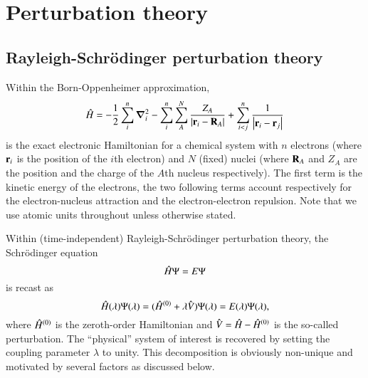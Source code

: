\documentclass[aps,prb,reprint,noshowkeys,superscriptaddress]{revtex4-1}
\newcommand{\hH}{\Hat{H}}
\newcommand{\hV}{\Hat{V}}
\begin{document}
\section{Perturbation theory}

\subsection{Rayleigh-Schr\"odinger perturbation theory}

Within the Born-Oppenheimer approximation, 
\begin{equation}\label{eq:ExactHamiltonian}
    \hH = - \frac{1}{2} \sum_{i}^{n} \grad_i^2 - \sum_{i}^{n} \sum_{A}^{N} \frac{Z_A}{\abs{\vb{r}_i-\vb{R}_A}} + \sum_{i<j}^{n}\frac{1}{\abs{\vb{r}_i-\vb{r}_j}}
\end{equation}
is the exact electronic Hamiltonian for a chemical system with $n$ electrons (where $\vb{r}_i$ is the position of the $i$th electron) and $N$ (fixed) nuclei (where $\vb{R}_A$ and $Z_A$ are the position and the charge of the $A$th nucleus respectively). 
The first term is the kinetic energy of the electrons, the two following terms account respectively for the electron-nucleus attraction and the electron-electron repulsion.
Note that we use atomic units throughout unless otherwise stated.

Within (time-independent) Rayleigh-Schr\"odinger perturbation theory, the Schr\"odinger equation 
\begin{equation} \label{eq:SchrEq}
	\hH \Psi = E \Psi
\end{equation} 
is recast as 
\begin{equation} \label{eq:SchrEq-PT}
	\hH(\lambda) \Psi(\lambda) = (\hH^{(0)} + \lambda \hV ) \Psi(\lambda) = E(\lambda) \Psi(\lambda),
\end{equation}
where $\hH^{(0)}$ is the zeroth-order Hamiltonian and $\hV = \hH - \hH^{(0)}$ is the so-called perturbation.
The ``physical'' system of interest is recovered by setting the coupling parameter $\lambda$ to unity.
This decomposition is obviously non-unique and motivated by several factors as discussed below. \cite{Mihalka_2017b}
\end{document}
